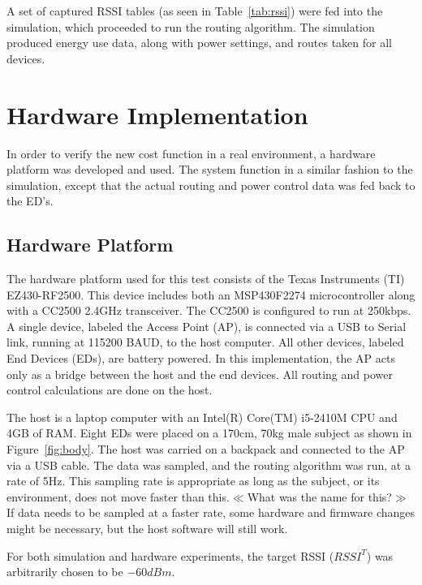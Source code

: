 \documentclass{article}
\begin{document}
A set of captured RSSI tables (as seen in Table~\ref{tab:rssi}) were fed into the simulation, which proceeded to run the routing algorithm. The simulation produced energy use data, along with power settings, and routes taken for all devices.

\section{Hardware Implementation}\label{sec:hardware}
In order to verify the new cost function in a real environment, a hardware platform was developed and used. The system function in a similar fashion to the simulation, except that the actual routing and power control data was fed back to the ED's.

\subsection{Hardware Platform}
The hardware platform used for this test consists of the Texas Instruments (TI) EZ430-RF2500. This device includes both an MSP430F2274 microcontroller along with a CC2500 2.4GHz transceiver. The CC2500 is configured to run at 250kbps.
A single device, labeled the Access Point (AP), is connected via a USB to Serial link, running at 115200 BAUD, to the host computer. All other devices, labeled End Devices (EDs), are battery powered. In this implementation, the AP acts only as a bridge between the host and the end devices. All routing and power control calculations are done on the host.

The host is a laptop computer with an Intel(R) Core(TM) i5-2410M CPU and 4GB of RAM. Eight EDs were placed on a 170cm, 70kg male subject as shown in Figure~\ref{fig:body}. The host was carried on a backpack and connected to the AP via a USB cable. The data was sampled, and the routing algorithm was run, at a rate of 5Hz. This sampling rate is appropriate as long as the subject, or its environment, does not move faster than this.$\ll$What was the name for this?$\gg$ If data needs to be sampled at a faster rate, some hardware and firmware changes might be necessary, but the host software will still work.

For both simulation and hardware experiments, the target RSSI ($RSSI^T$) was arbitrarily chosen to be $-60 dBm$.
\end{document}
